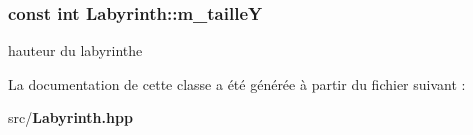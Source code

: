 \subsubsection[{m\-\_\-taille\-Y}]{\setlength{\rightskip}{0pt plus 5cm}const int Labyrinth\-::m\-\_\-taille\-Y\hspace{0.3cm}{\ttfamily [private]}}\label{class_labyrinth_ae656bd00c1402e153c89611b374a9567}


hauteur du labyrinthe 



La documentation de cette classe a été générée à partir du fichier suivant \-:\begin{DoxyCompactItemize}
\item 
src/{\bf Labyrinth.\-hpp}\end{DoxyCompactItemize}
